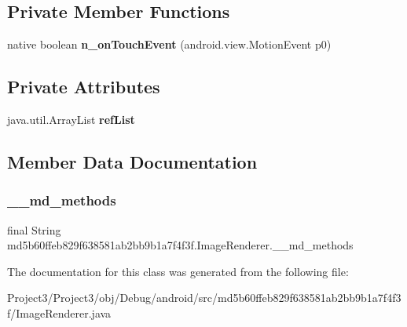 \subsection*{Private Member Functions}
\begin{DoxyCompactItemize}
\item 
\mbox{\label{classmd5b60ffeb829f638581ab2bb9b1a7f4f3f_1_1ImageRenderer_a68e0694015ee10a62b53a937e6a39a97}} 
native boolean {\bfseries n\+\_\+on\+Touch\+Event} (android.\+view.\+Motion\+Event p0)
\end{DoxyCompactItemize}
\subsection*{Private Attributes}
\begin{DoxyCompactItemize}
\item 
\mbox{\label{classmd5b60ffeb829f638581ab2bb9b1a7f4f3f_1_1ImageRenderer_a1489fe181115bffda1ea70a17aeeaedc}} 
java.\+util.\+Array\+List {\bfseries ref\+List}
\end{DoxyCompactItemize}


\subsection{Member Data Documentation}
\mbox{\label{classmd5b60ffeb829f638581ab2bb9b1a7f4f3f_1_1ImageRenderer_a270ae274b970d099f33432d32109ce8b}} 
\subsubsection{\texorpdfstring{\+\_\+\+\_\+md\+\_\+methods}{\_\_md\_methods}}
{\footnotesize\ttfamily final String md5b60ffeb829f638581ab2bb9b1a7f4f3f.\+Image\+Renderer.\+\_\+\+\_\+md\+\_\+methods\hspace{0.3cm}{\ttfamily [static]}}



The documentation for this class was generated from the following file\+:\begin{DoxyCompactItemize}
\item 
Project3/\+Project3/obj/\+Debug/android/src/md5b60ffeb829f638581ab2bb9b1a7f4f3f/Image\+Renderer.\+java\end{DoxyCompactItemize}
